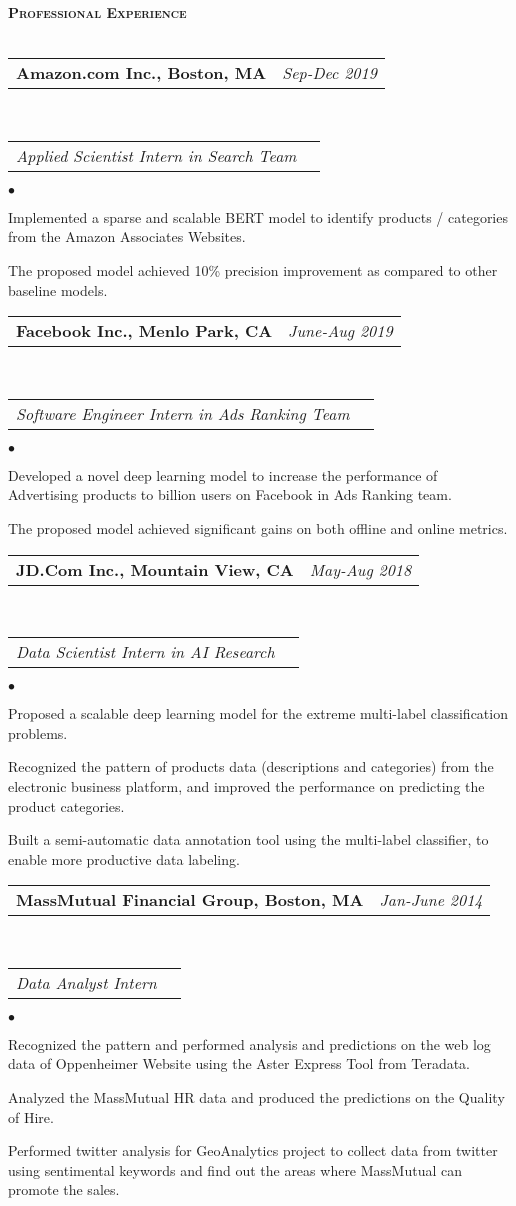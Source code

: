 \documentclass[11pt]{article}
\makeatletter
\newcommand{\lineunder}{\vspace*{-8pt} \\ \hspace*{-18pt} \hrulefill \\}
\newcommand{\header}[1]{{\hspace*{-15pt}\vspace*{6pt} \large \textsc{\textbf{#1}}} \vspace*{-6pt} \lineunder}
\newenvironment{achievements}{\begin{list}{$\bullet$}{\topsep 0pt \itemsep -2pt}}{\vspace*{4pt}\end{list}}
\newcommand{\headerrow}[2]
{\begin{tabular*}{\linewidth}{l@{\extracolsep{\fill}}r}
	\hspace*{-15pt}#1 & #2 \\
\end{tabular*}}
\newcommand{\headerrowww}[1]
{\begin{tabular*}{\linewidth}{l@{\extracolsep{\fill}}r}
	#1 &\\
\end{tabular*}}
\makeatother
\begin{document}
\vspace*{2.5pt}
\header{Professional Experience}

\headerrow
{\textbf{Amazon.com Inc., Boston, MA}}
{\emph{Sep-Dec 2019}}
\\
\headerrowww
{\emph{Applied Scientist Intern in Search Team}}
	\begin{achievements}
	\item Implemented a sparse and scalable BERT model to identify products / categories from the Amazon Associates Websites.

	\item The proposed model achieved 10\% precision improvement as compared to other baseline models.
	\end{achievements}


\headerrow
{\textbf{Facebook Inc., Menlo Park, CA}}
{\emph{June-Aug 2019}}
\\
\headerrowww
{\emph{Software Engineer Intern in Ads Ranking Team}}
	\begin{achievements}
	\item Developed a novel deep learning model to increase the performance of Advertising products to billion users on Facebook in Ads Ranking team.

	\item The proposed model achieved significant gains on both offline and online metrics.
	\end{achievements}

\headerrow
{\textbf{JD.Com Inc., Mountain View, CA}}
{\emph{May-Aug 2018}}
\\
\headerrowww
{\emph{Data Scientist Intern in AI Research}}
	\begin{achievements}
	\item Proposed a scalable deep learning model for the extreme multi-label classification problems.
	\item Recognized the pattern of products data (descriptions and categories) from the electronic business platform, and improved the performance on predicting the product categories.
	\item Built a semi-automatic data annotation tool using the multi-label classifier, to enable more productive data labeling.
	\end{achievements}

\headerrow
{\textbf{MassMutual Financial Group, Boston, MA}}
{\emph{Jan-June 2014}}
\\
\headerrowww
{\emph{Data Analyst Intern}}
	\begin{achievements}
	\item Recognized the pattern and performed analysis and predictions on the web log data of Oppenheimer Website using the Aster Express Tool from Teradata.
	\item Analyzed the MassMutual HR data and produced the predictions on the Quality of Hire.
	\item Performed twitter analysis for GeoAnalytics project to collect data from twitter using sentimental keywords and find out the areas where MassMutual can promote the sales.
	\end{achievements}
	
\end{document}
